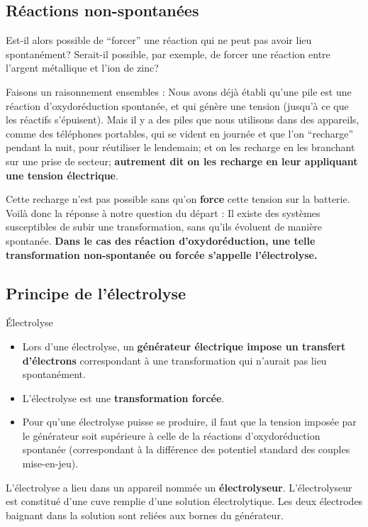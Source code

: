 \documentclass[11pt,a4paper]{article}
\begin{document}
\subsection{Réactions non-spontanées}

Est-il alors possible de ``forcer'' une réaction qui ne peut pas avoir lieu spontanément? Serait-il possible, par exemple, de forcer une réaction entre l'argent métallique et l'ion de zinc? 

Faisons un raisonnement ensembles : Nous avons déjà établi qu'une pile est une réaction d'oxydoréduction spontanée, et qui génère une tension (jusqu'à ce que les réactifs s'épuisent). Mais il y a des piles que nous utilisons dans des appareils, comme des téléphones portables, qui se vident en journée et que l'on ``recharge'' pendant la nuit, pour réutiliser le lendemain; et on les recharge en les branchant sur une prise de secteur; \textbf{autrement dit on les recharge en leur appliquant une tension électrique}.  

Cette recharge n'est pas possible sans qu'on \textbf{force} cette tension sur la batterie. Voilà donc la réponse à notre question du départ : Il existe des systèmes susceptibles de subir une transformation, sans qu'ils évoluent de manière spontanée. \textbf{Dans le cas des réaction d'oxydoréduction, une telle transformation non-spontanée ou forcée s'appelle l'électrolyse. }

\subsection{Principe de l'électrolyse}

\begin{defn}{Électrolyse}
\begin{itemize}
    \item Lors d'une électrolyse, un \textbf{générateur électrique impose un transfert d'électrons} correspondant à une transformation qui n'aurait pas lieu spontanément. 
    \item L'électrolyse est une \textbf{transformation forcée}. 
    \item Pour qu'une électrolyse puisse se produire, il faut que la tension imposée par le générateur soit supérieure à celle de la réactions d'oxydoréduction spontanée (correspondant à la différence des potentiel standard des couples mise-en-jeu). 
\end{itemize}
\end{defn}

L'électrolyse a lieu dans un appareil nommée un \textbf{électrolyseur}. L'électrolyseur est constitué d'une cuve remplie d'une solution électrolytique. Les deux électrodes baignant dans la solution sont reliées aux bornes du générateur. 
\end{document}
